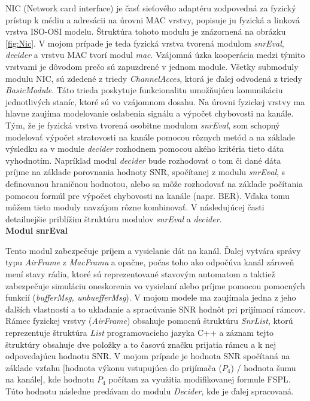 \documentclass[11pt,twoside,a4paper]{book}
\begin{document}
NIC (Network card interface) je časť sieťového adaptéru zodpovedná za fyzický prístup k médiu a adresácii na úrovni MAC vrstvy, popisuje ju fyzická a linková vrstva ISO-OSI modelu. Štruktúra tohoto modulu je znázornená na obrázku \ref{fig:Nic}. V mojom prípade je teda fyzická vrstva tvorená modulom \textit{snrEval}, \textit{decider} a vrstvu MAC tvorí modul \textit{mac}. Vzájomná úzka kooperácia medzi týmito vrstvami je dôvodom prečo sú zapuzdrené v jednom module. Všetky submoduly modulu NIC, sú zdedené z triedy \textit{ChannelAcces}, ktorá je ďalej odvodená z triedy \textit{BasicModule}. Táto trieda poskytuje funkcionalitu umožňujúcu komunikáciu jednotlivých staníc, ktoré sú vo vzájomnom dosahu. Na úrovni fyzickej vrstvy ma hlavne zaujíma modelovanie oslabenia signálu a výpočet chybovosti na kanále. Tým, že je fyzická vrstva tvorená osobitne modulom \textit{snrEval}, som schopný modelovať výpočet stratovosti na kanále pomocou rôznych metód a na základe výsledku sa v module \textit{decider} rozhodnem pomocou akého kritéria tieto dáta vyhodnotím. Napríklad modul \textit{decider} bude rozhodovať o tom či dané dáta príjme na základe porovnania hodnoty SNR, spočítanej z modulu \textit{snrEval}, s definovanou hraničnou hodnotou, alebo sa môže rozhodovať na základe počítania pomocou formúl pre výpočet chybovosti na kanále (napr. BER). Vďaka tomu môžem tieto moduly navzájom rôzne kombinovať. V následujúcej časti detailnejšie priblížim štruktúru modulov \textit{snrEval} a \textit{decider}. \\


\noindent\textbf{Modul snrEval}

Tento modul zabezpečuje príjem a vysielanie dát na kanál. Ďalej vytvára správy typu \textit{AirFrame} z \textit{MacFramu} a opačne, počas toho ako odpočúva kanál zároveň mení stavy rádia, ktoré sú reprezentované stavovým automatom a taktiež zabezpečuje simuláciu oneskorenia vo vysielaní alebo príjme pomocou pomocných funkcií (\textit{bufferMsg, unbuefferMsg}). V mojom modele ma zaujímala jedna z jeho ďalších vlastností a to ukladanie a spracúvanie SNR hodnôt pri prijímaní rámcov. Rámec fyzickej vrstvy (\textit{AirFrame}) obsahuje pomocnú štruktúru \textit{SnrList}, ktorú reprezentuje štruktúra \textit{List} programovacieho jazyka C++ a záznam tejto štruktúry obsahuje dve položky a to časovú značku prijatia rámcu a k nej odpovedajúcu hodnotu SNR. V mojom prípade je hodnota SNR spočítaná na základe vzťahu [hodnota výkonu vstupujúca do prijímača ($P_{4}$) / hodnota šumu na kanále], kde hodnotu $P_{4}$ počítam za využitia modifikovanej formule FSPL. Túto hodnotu následne predávam do modulu \textit{Decider}, kde je ďalej spracovaná.
\end{document}
